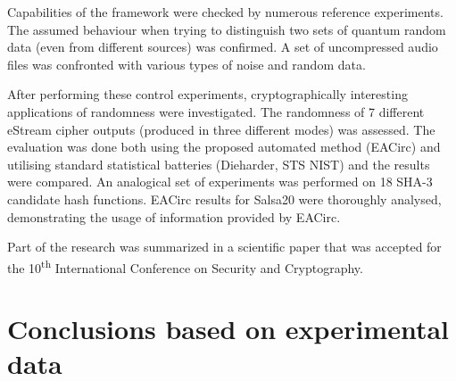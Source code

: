 \documentclass[12pt,oneside]{fithesis2}		%
\renewcommand{\_}{\leavevmode \kern0.0em\vbox{\hrule width0.4em}}
\begin{document}
Capabilities of the framework were checked by numerous reference experiments. The assumed behaviour when trying to distinguish
two sets of quantum random data (even from different sources) was confirmed. A set of uncompressed audio files was confronted with
various types of noise and random data. 

After performing these control experiments, cryptographically interesting applications of randomness were investigated.
The randomness of 7 different eStream cipher outputs (produced in three different modes) was assessed.
The evaluation was done both using the proposed automated method (EACirc) and utilising standard statistical batteries
(Dieharder, STS NIST) and the results were compared. An analogical set of experiments was performed 
on 18 SHA-3 candidate hash functions.
EACirc results for Salsa20 were thoroughly analysed, demonstrating the usage of information provided by EACirc.

Part of the research was summarized in a scientific paper that was accepted for the 10\textsuperscript{th} International Conference
on Security and Cryptography. \parencite{lab-paper}

\section{Conclusions based on experimental data}
\label{sec:outro-conclusions}
\end{document}
